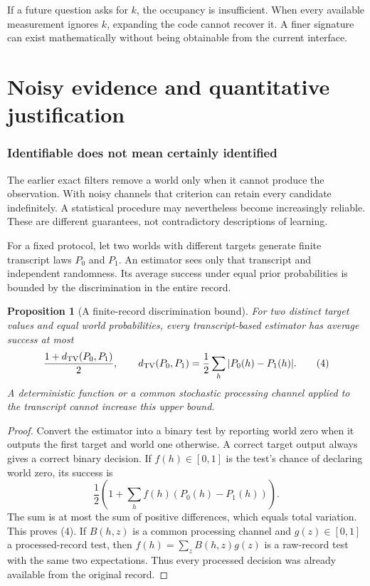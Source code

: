 \documentclass[11pt,letterpaper]{article}
\theoremstyle{plain}
\newtheorem{proposition}[theorem]{Proposition}
\theoremstyle{definition}
\begin{document}
If a future question asks for $k$, the occupancy is insufficient. When every available measurement ignores $k$, expanding the code cannot recover it. A finer signature can exist mathematically without being obtainable from the current interface.

\FloatBarrier\clearpage
\part{Noisy evidence and quantitative justification}
\section{Identifiable does not mean certainly identified}\label{sec:noise}
The earlier exact filters remove a world only when it cannot produce the observation. With noisy channels that criterion can retain every candidate indefinitely. A statistical procedure may nevertheless become increasingly reliable. These are different guarantees, not contradictory descriptions of learning.

For a fixed protocol, let two worlds with different targets generate finite transcript laws $P_0$ and $P_1$. An estimator sees only that transcript and independent randomness. Its average success under equal prior probabilities is bounded by the discrimination in the entire record.

\begin{proposition}[A finite-record discrimination bound]\label{prop:testing}
For two distinct target values and equal world probabilities, every transcript-based estimator has average success at most
\[
\frac{1+d_{\mathrm{TV}}(P_0,P_1)}{2},\qquad
d_{\mathrm{TV}}(P_0,P_1)=\frac12\sum_h|P_0(h)-P_1(h)|.\tag{4}
\]
A deterministic function or a common stochastic processing channel applied to the transcript cannot increase this upper bound.
\end{proposition}
\begin{proof}
Convert the estimator into a binary test by reporting world zero when it outputs the first target and world one otherwise. A correct target output always gives a correct binary decision. If $f(h)\in[0,1]$ is the test's chance of declaring world zero, its success is
\[
\frac12\left(1+\sum_h f(h)(P_0(h)-P_1(h))\right).
\]
The sum is at most the sum of positive differences, which equals total variation. This proves (4). If $B(h,z)$ is a common processing channel and $g(z)\in[0,1]$ a processed-record test, then $f(h)=\sum_zB(h,z)g(z)$ is a raw-record test with the same two expectations. Thus every processed decision was already available from the original record.
\end{proof}
\end{document}
